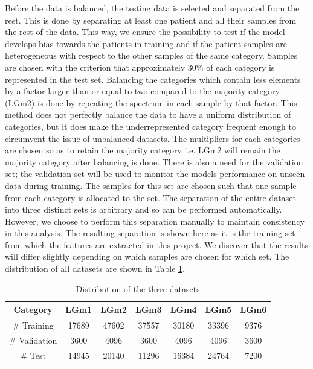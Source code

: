 Before the data is balanced, the testing data is selected and separated from the rest. This is done by separating at least one patient and all their samples from the rest of the data. This way, we ensure the possibility to test if the model develops bias towards the patients in training and if the patient samples are heterogeneous with respect to the other samples of the same category. Samples are chosen with the criterion that approximately $30\%$ of each category is represented in the test set. Balancing the categories which contain less elements by a factor larger than or equal to two compared to the majority category (LGm2) is done by repeating the spectrum in each sample by that factor. This method does not perfectly balance the data to have a uniform distribution of categories, but it does make the underrepresented category frequent enough to circumvent the issue of unbalanced datasets. The multipliers for each categories are chosen so as to retain the majority category i.e. LGm2 will remain the majority category after balancing is done. There is also a need for the validation set; the validation set will be used to monitor the models performance on unseen data during training. The samples for this set are chosen such that one sample from each category is allocated to the set. The separation of the entire dataset into three distinct sets is arbitrary and so can be performed automatically. However, we choose to perform this separation manually to maintain consistency in this analysis. The resulting separation is shown here as it is the training set from which the features are extracted in this project. We discover that the results will differ slightly depending on which samples are chosen for which set. The distribution of all datasets are shown in Table \ref{table:2}.

\begin{table}[H]
\centering
 \begin{tabular}{||c c c c c c c||} 
 \hline
 Category & LGm1 & LGm2 & LGm3 & LGm4 & LGm5 & LGm6 \\ [0.5ex] 
 \hline\hline
 \# Training & 17689 & 47602 & 37557 & 30180 & 33396 & 9376 \\
 \hline 
 \# Validation & 3600 & 4096 & 3600 & 4096 & 4096 & 3600 \\
 \hline
 \# Test & 14945 & 20140 & 11296 & 16384 & 24764 & 7200 \\
 \hline

\end{tabular}
\caption{Distribution of the three datasets}
\label{table:2}
\end{table}

